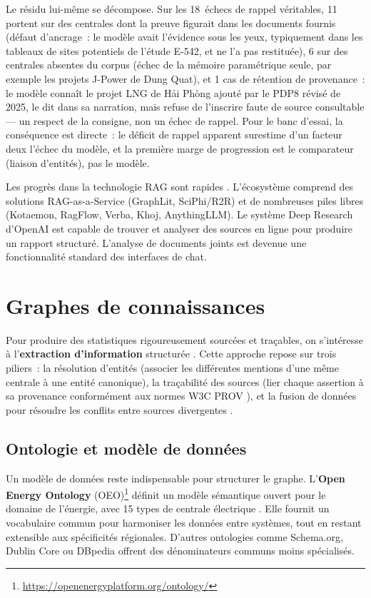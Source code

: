 \documentclass[a4paper,11pt]{report}
\begin{document}
Le résidu lui-même se décompose. Sur les 18~échecs de rappel véritables, 11 portent sur des centrales dont la preuve figurait dans les documents fournis (défaut d'ancrage~: le modèle avait l'évidence sous les yeux, typiquement dans les tableaux de sites potentiels de l'étude E-542, et ne l'a pas restituée), 6 sur des centrales absentes du corpus (échec de la mémoire paramétrique seule, par exemple les projets J-Power de Dung Quat), et 1 cas de rétention de provenance~: le modèle connaît le projet LNG de Hải Phòng ajouté par le PDP8 révisé de 2025, le dit dans sa narration, mais refuse de l'inscrire faute de source consultable --- un respect de la consigne, non un échec de rappel. Pour le banc d'essai, la conséquence est directe~: le déficit de rappel apparent surestime d'un facteur deux l'échec du modèle, et la première marge de progression est le comparateur (liaison d'entités), pas le modèle.

Les progrès dans la technologie RAG sont rapides \citep{UEIVYTV4,SQX6VZRP}. L'écosystème comprend des solutions RAG-as-a-Service (GraphLit, SciPhi/R2R) et de nombreuses piles libres (Kotaemon, RagFlow, Verba, Khoj, AnythingLLM). Le système Deep Research d'OpenAI \citep{Y6A39QJJ} est capable de trouver et analyser des sources en ligne pour produire un rapport structuré. L'analyse de documents joints est devenue une fonctionnalité standard des interfaces de chat.

\chapter{Graphes de connaissances}\label{chap:kg}

Pour produire des statistiques rigoureusement sourcées et traçables, on s'intéresse à l'\textbf{extraction d'information} structurée \citep{MZNGHBPG,D2S7WQT2,P7LFRX4U}. Cette approche repose sur trois piliers~: la résolution d'entités (associer les différentes mentions d'une même centrale à une entité canonique), la traçabilité des sources (lier chaque assertion à sa provenance conformément aux normes W3C PROV \citep{LXQUK658}), et la fusion de données pour résoudre les conflits entre sources divergentes \citep{RI2MXYYS}.

\section{Ontologie et modèle de données}

Un modèle de données reste indispensable pour structurer le graphe. L'\textbf{Open Energy Ontology} (OEO)\footnote{\url{https://openenergyplatform.org/ontology/}} définit un modèle sémantique ouvert pour le domaine de l'énergie, avec 15 types de centrale électrique \citep{G49STI5L}. Elle fournit un vocabulaire commun pour harmoniser les données entre systèmes, tout en restant extensible aux spécificités régionales. D'autres ontologies comme Schema.org, Dublin Core ou DBpedia offrent des dénominateurs communs moins spécialisés.
\end{document}
